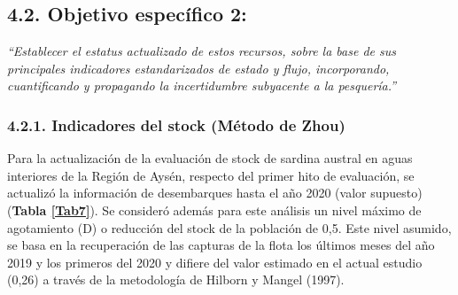 \documentclass[
  spanish,
]{article}
\begin{document}
\normalsize 
\pagebreak

\hypertarget{objetivo-especuxedfico-2-1}{%
\subsection{4.2. Objetivo específico
2:}\label{objetivo-especuxedfico-2-1}}

\vspace{-0.2cm}

\emph{``Establecer el estatus actualizado de estos recursos, sobre la
base de sus principales indicadores estandarizados de estado y flujo,
incorporando, cuantificando y propagando la incertidumbre subyacente a
la pesquería.''} \vspace{0.5cm}

\hypertarget{indicadores-del-stock-muxe9todo-de-zhou}{%
\subsubsection{4.2.1. Indicadores del stock (Método de
Zhou)}\label{indicadores-del-stock-muxe9todo-de-zhou}}

Para la actualización de la evaluación de stock de sardina austral en
aguas interiores de la Región de Aysén, respecto del primer hito de
evaluación, se actualizó la información de desembarques hasta el año
2020 (valor supuesto) (\textbf{Tabla \ref{Tab7}}). Se consideró además
para este análisis un nivel máximo de agotamiento (D) o reducción del
stock de la población de 0,5. Este nivel asumido, se basa en la
recuperación de las capturas de la flota los últimos meses del año 2019
y los primeros del 2020 y difiere del valor estimado en el actual
estudio (0,26) a través de la metodología de Hilborn y Mangel (1997).

\vspace{0.5cm}
\end{document}
